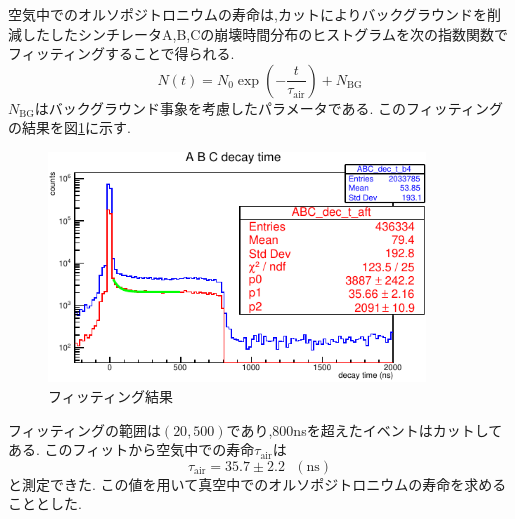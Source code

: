 空気中でのオルソポジトロニウムの寿命は,カットによりバックグラウンドを削減したしたシンチレータA,B,Cの崩壊時間分布のヒストグラムを次の指数関数でフィッティングすることで得られる.
\begin{equation}
	\nonumber
N(t)=N_0\exp(-\frac{t}{\tau_\textrm{air}})+N_\textrm{BG}
\end{equation}
$N_\textrm{BG}$はバックグラウンド事象を考慮したパラメータである.
このフィッティングの結果を図\ref{fig:life_in_air}に示す.
\begin{figure}[H]
	\centering
		\includegraphics[width=10cm]{fig/isb/life_air.pdf}
		\caption{フィッティング結果}
		\label{fig:life_in_air}
\end{figure}
フィッティングの範囲は$(20,500)$であり,800nsを超えたイベントはカットしてある.
このフィットから空気中での寿命$\tau_\textrm{air}$は
\begin{equation}
	\nonumber
	\tau_\textrm{air}=35.7\pm 2.2 \hspace{8pt}(\textrm{ns})
\end{equation}
と測定できた.
この値を用いて真空中でのオルソポジトロニウムの寿命を求めることとした.

